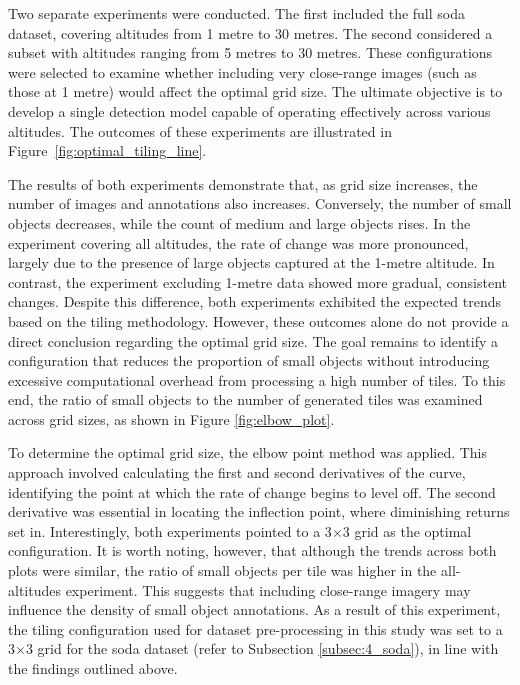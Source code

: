 Two separate experiments were conducted. The first included the full \gls{soda} dataset, covering altitudes from 1 metre to 30 metres. The second considered a subset with altitudes ranging from 5 metres to 30 metres. These configurations were selected to examine whether including very close-range images (such as those at 1 metre) would affect the optimal grid size. The ultimate objective is to develop a single detection model capable of operating effectively across various altitudes. The outcomes of these experiments are illustrated in Figure~\ref{fig:optimal_tiling_line}.

The results of both experiments demonstrate that, as grid size increases, the number of images and annotations also increases. Conversely, the number of small objects decreases, while the count of medium and large objects rises. In the experiment covering all altitudes, the rate of change was more pronounced, largely due to the presence of large objects captured at the 1-metre altitude. In contrast, the experiment excluding 1-metre data showed more gradual, consistent changes. Despite this difference, both experiments exhibited the expected trends based on the tiling methodology.
However, these outcomes alone do not provide a direct conclusion regarding the optimal grid size. The goal remains to identify a configuration that reduces the proportion of small objects without introducing excessive computational overhead from processing a high number of tiles. To this end, the ratio of small objects to the number of generated tiles was examined across grid sizes, as shown in Figure \ref{fig:elbow_plot}.

To determine the optimal grid size, the elbow point \cite{elbow_point} method was applied. This approach involved calculating the first and second derivatives of the curve, identifying the point at which the rate of change begins to level off. The second derivative was essential in locating the inflection point, where diminishing returns set in.
Interestingly, both experiments pointed to a 3$\times$3 grid as the optimal configuration. It is worth noting, however, that although the trends across both plots were similar, the ratio of small objects per tile was higher in the all-altitudes experiment. This suggests that including close-range imagery may influence the density of small object annotations.
As a result of this experiment, the tiling configuration used for dataset pre-processing in this study was set to a 3$\times$3 grid for the \gls{soda} dataset (refer to Subsection \ref{subsec:4_soda}), in line with the findings outlined above.

